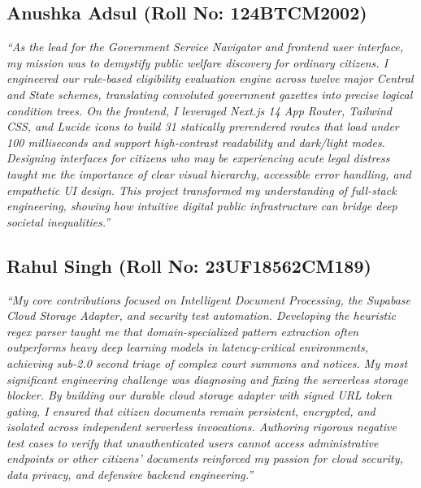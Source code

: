 \subsection{Anushka Adsul (Roll No: 124BTCM2002)}
\textit{``As the lead for the Government Service Navigator and frontend user interface, my mission was to demystify public welfare discovery for ordinary citizens. I engineered our rule-based eligibility evaluation engine across twelve major Central and State schemes, translating convoluted government gazettes into precise logical condition trees. On the frontend, I leveraged Next.js 14 App Router, Tailwind CSS, and Lucide icons to build 31 statically prerendered routes that load under 100 milliseconds and support high-contrast readability and dark/light modes. Designing interfaces for citizens who may be experiencing acute legal distress taught me the importance of clear visual hierarchy, accessible error handling, and empathetic UI design. This project transformed my understanding of full-stack engineering, showing how intuitive digital public infrastructure can bridge deep societal inequalities.''}

\subsection{Rahul Singh (Roll No: 23UF18562CM189)}
\textit{``My core contributions focused on Intelligent Document Processing, the Supabase Cloud Storage Adapter, and security test automation. Developing the heuristic regex parser taught me that domain-specialized pattern extraction often outperforms heavy deep learning models in latency-critical environments, achieving sub-2.0 second triage of complex court summons and notices. My most significant engineering challenge was diagnosing and fixing the serverless storage blocker. By building our durable cloud storage adapter with signed URL token gating, I ensured that citizen documents remain persistent, encrypted, and isolated across independent serverless invocations. Authoring rigorous negative test cases to verify that unauthenticated users cannot access administrative endpoints or other citizens' documents reinforced my passion for cloud security, data privacy, and defensive backend engineering.''}

